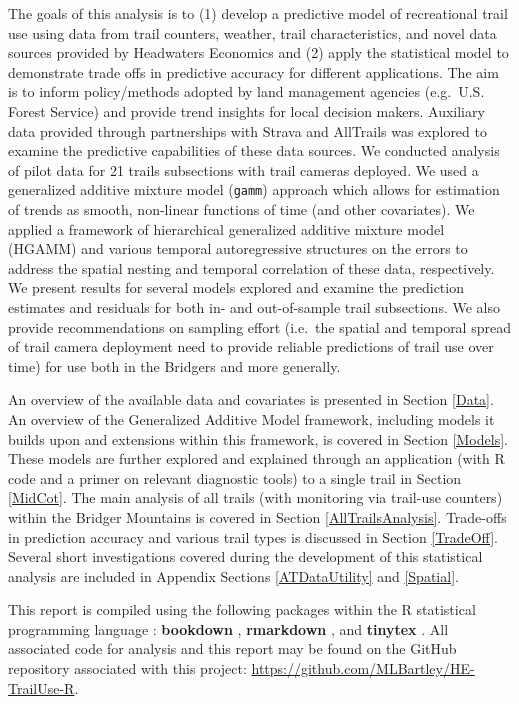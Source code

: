 \documentclass[
]{book}
\begin{document}
The goals of this analysis is to (1) develop a predictive model of recreational trail use using data from trail counters, weather, trail characteristics, and novel data sources provided by Headwaters Economics and (2) apply the statistical model to demonstrate trade offs in predictive accuracy for different applications. The aim is to inform policy/methods adopted by land management agencies (e.g.~U.S. Forest Service) and provide trend insights for local decision makers. Auxiliary data provided through partnerships with Strava and AllTrails was explored to examine the predictive capabilities of these data sources. We conducted analysis of pilot data for 21 trails subsections with trail cameras deployed. We used a generalized additive mixture model (\texttt{gamm}) approach which allows for estimation of trends as smooth, non-linear functions of time (and other covariates). We applied a framework of hierarchical generalized additive mixture model (HGAMM) \citep{pedersen2019hierarchical} and various temporal autoregressive structures on the errors to address the spatial nesting and temporal correlation of these data, respectively. We present results for several models explored and examine the prediction estimates and residuals for both in- and out-of-sample trail subsections. We also provide recommendations on sampling effort (i.e.~the spatial and temporal spread of trail camera deployment need to provide reliable predictions of trail use over time) for use both in the Bridgers and more generally.

An overview of the available data and covariates is presented in Section \ref{Data}. An overview of the Generalized Additive Model framework, including models it builds upon and extensions within this framework, is covered in Section \ref{Models}. These models are further explored and explained through an application (with R code and a primer on relevant diagnostic tools) to a single trail in Section \ref{MidCot}. The main analysis of all trails (with monitoring via trail-use counters) within the Bridger Mountains is covered in Section \ref{AllTrailsAnalysis}. Trade-offs in prediction accuracy and various trail types is discussed in Section \ref{TradeOff}. Several short investigations covered during the development of this statistical analysis are included in Appendix Sections \ref{ATDataUtility} and \ref{Spatial}.

This report is compiled using the following packages within the R statistical programming language \citep{R-base}: \textbf{bookdown} \citep{R-bookdown}, \textbf{rmarkdown} \citep{R-rmarkdown}, and \textbf{tinytex} \citep{R-tinytex}. All associated code for analysis and this report may be found on the GitHub repository associated with this project: \url{https://github.com/MLBartley/HE-TrailUse-R}.
\end{document}
